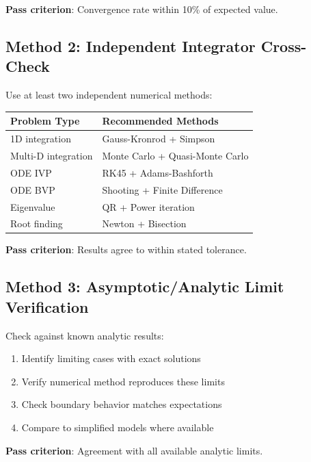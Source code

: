 \textbf{Pass criterion}: Convergence rate within 10\% of expected value.

\subsection{Method 2: Independent Integrator Cross-Check}

Use at least two independent numerical methods:

\begin{center}
\begin{tabular}{ll}
\toprule
\textbf{Problem Type} & \textbf{Recommended Methods} \\
\midrule
1D integration & Gauss-Kronrod + Simpson \\
Multi-D integration & Monte Carlo + Quasi-Monte Carlo \\
ODE IVP & RK45 + Adams-Bashforth \\
ODE BVP & Shooting + Finite Difference \\
Eigenvalue & QR + Power iteration \\
Root finding & Newton + Bisection \\
\bottomrule
\end{tabular}
\end{center}

\textbf{Pass criterion}: Results agree to within stated tolerance.

\subsection{Method 3: Asymptotic/Analytic Limit Verification}

Check against known analytic results:

\begin{enumerate}
\item Identify limiting cases with exact solutions
\item Verify numerical method reproduces these limits
\item Check boundary behavior matches expectations
\item Compare to simplified models where available
\end{enumerate}

\textbf{Pass criterion}: Agreement with all available analytic limits.

